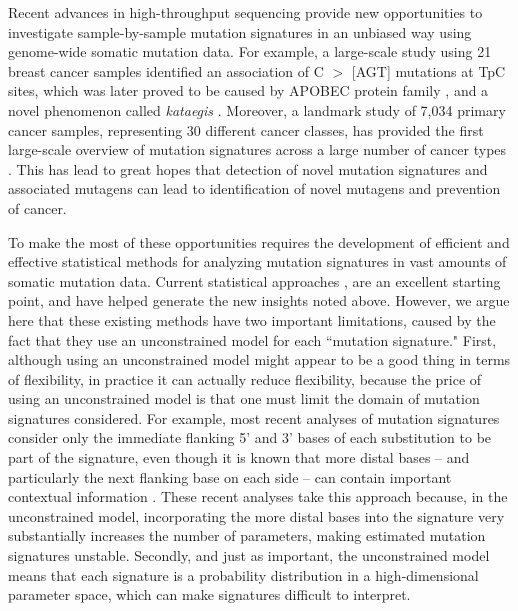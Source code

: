 \documentclass[10pt,letterpaper]{article}
\begin{document}
Recent advances in high-throughput sequencing provide
new opportunities to investigate sample-by-sample mutation signatures in an unbiased way
using genome-wide somatic mutation data. For example, a large-scale
study using 21 breast cancer samples identified an association of C $>$ [AGT] mutations at TpC sites, 
which was later proved to be caused by APOBEC protein family \cite{pmid23389445, pmid23852168, pmid23852170}, 
and a novel phenomenon called {\it kataegis} \cite{pmid22608084}. 
Moreover, a landmark study of 7,034 primary cancer samples, representing 30 different cancer classes, has provided the first large-scale overview of mutation signatures across a large number of cancer types \cite{pmid23945592}. This has lead to great hopes that detection of novel mutation signatures and associated mutagens can lead to identification of novel mutagens and prevention of cancer.

To make the most of these opportunities requires the development
of efficient and effective statistical methods for analyzing
mutation signatures in vast amounts of somatic mutation data.
Current statistical approaches \cite{pmid23318258,pmid23628380}, 
are an excellent starting point, 
and have helped generate the new insights noted above.
However, we argue here that these existing methods 
have two important limitations, caused by the fact that they
use an unconstrained model for each ``mutation signature."
First, although using an unconstrained model might appear to be a good thing in terms of flexibility, 
in practice it can actually reduce flexibility, because
the price of using an unconstrained model is that one must limit 
the domain of mutation signatures considered. 
For example, most recent analyses of mutation signatures
consider only the immediate flanking 5' and 3' bases of each substitution to be part of
the signature, even though it is known that more distal bases -- and particularly the
next flanking base on each side -- can contain important contextual information
\cite{pmid9683596}. These recent analyses take this approach because, in the unconstrained model,
incorporating the more distal bases into the signature very substantially increases the number of parameters, making estimated mutation signatures unstable.
Secondly, and just as important, the unconstrained model means
that each signature is a probability distribution in a high-dimensional
parameter space, which can make signatures difficult to interpret.
\end{document}
